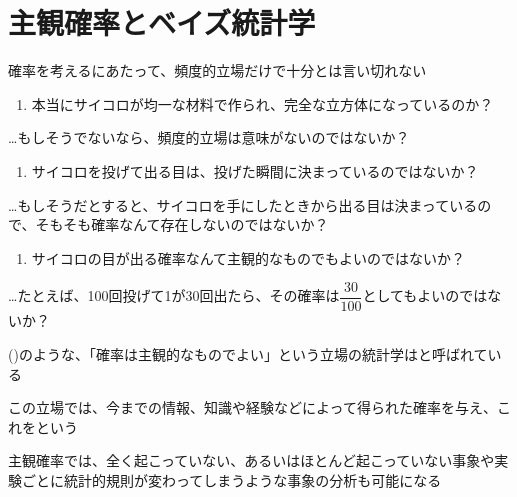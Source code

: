 \documentclass[../../../topic_probability-statistics]{subfiles}
\begin{document}
\sectionline
\section{主観確率とベイズ統計学}

確率を考えるにあたって、頻度的立場だけで十分とは言い切れない

\begin{enumerate}[label=\romanlabel]
  \item 本当にサイコロが均一な材料で作られ、完全な立方体になっているのか？
\end{enumerate}

…もしそうでないなら、頻度的立場は意味がないのではないか？

\begin{enumerate}[label=\romanlabel, resume]
  \item サイコロを投げて出る目は、投げた瞬間に決まっているのではないか？
\end{enumerate}

…もしそうだとすると、サイコロを手にしたときから出る目は決まっているので、そもそも確率なんて存在しないのではないか？

\begin{enumerate}[label=\romanlabel, resume]
  \item サイコロの目が出る確率なんて主観的なものでもよいのではないか？
\end{enumerate}

…たとえば、100回投げて1が30回出たら、その確率は$\dfrac{30}{100}$としてもよいのではないか？

\sectionline

()のような、「確率は主観的なものでよい」という立場の統計学はと呼ばれている

\br

この立場では、今までの情報、知識や経験などによって得られた確率を与え、これをという

\br

主観確率では、全く起こっていない、あるいはほとんど起こっていない事象や実験ごとに統計的規則が変わってしまうような事象の分析も可能になる
\end{document}
